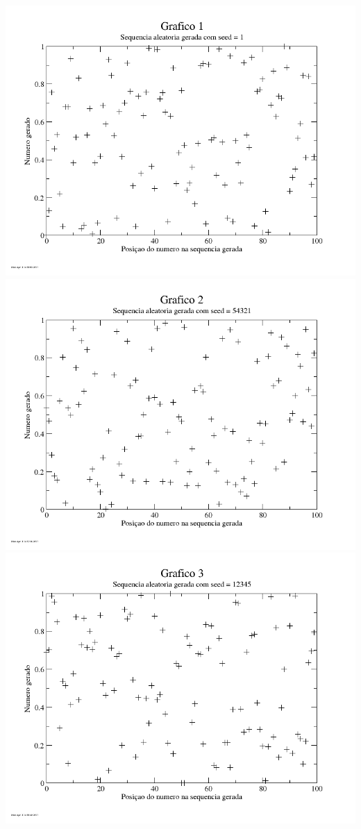 \message{ !name(relatorio.tex)}\documentclass{article}
\begin{document}
\includegraphics[width=\textwidth]{graf1}
\includegraphics[width=\textwidth]{graf2}
\includegraphics[width=\textwidth]{graf3}
\end{document}
